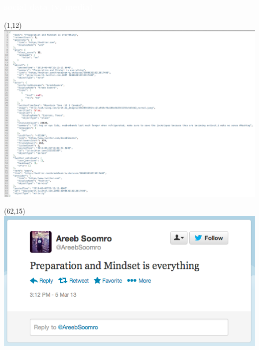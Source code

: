 \documentclass{beamer}
\begin{document}
\begin{frame} \frametitle{\textcolor{white} {social data (v. media)}}

\begin{textblock}{1}(1,12)
	\includegraphics[scale=0.26]{./imgs/twac.png}
\end{textblock}

\begin{textblock}{40}(62,15)		%
	\includegraphics[scale=0.25]{./imgs/tweet.png}
\end{textblock}

\end{frame}
\end{document}
